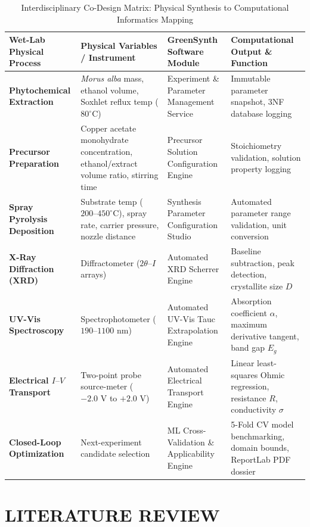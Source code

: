 \documentclass[12pt,a4paper,oneside]{report}
\begin{document}
{{{\begin{table}[h!]
\centering
\caption{Interdisciplinary Co-Design Matrix: Physical Synthesis to Computational Informatics Mapping}
\label{tab:interdisciplinary_matrix}
\begin{tabular}{|p{3.2cm}|p{3.8cm}|p{3.8cm}|p{4.2cm}|}
\hline
\textbf{Wet-Lab Physical Process} & \textbf{Physical Variables / Instrument} & \textbf{GreenSynth Software Module} & \textbf{Computational Output \& Function} \\
\hline
\textbf{Phytochemical Extraction} & \textit{Morus alba} mass, ethanol volume, Soxhlet reflux temp ($80^\circ\text{C}$) & Experiment \& Parameter Management Service & Immutable parameter snapshot, 3NF database logging \\
\hline
\textbf{Precursor Preparation} & Copper acetate monohydrate concentration, ethanol/extract volume ratio, stirring time & Precursor Solution Configuration Engine & Stoichiometry validation, solution property logging \\
\hline
\textbf{Spray Pyrolysis Deposition} & Substrate temp ($200\text{--}450^\circ\text{C}$), spray rate, carrier pressure, nozzle distance & Synthesis Parameter Configuration Studio & Automated parameter range validation, unit conversion \\
\hline
\textbf{X-Ray Diffraction (XRD)} & Diffractometer ($2\theta\text{--}I$ arrays) & Automated XRD Scherrer Engine & Baseline subtraction, peak detection, crystallite size $D$ \\
\hline
\textbf{UV-Vis Spectroscopy} & Spectrophotometer ($190\text{--}1100\text{ nm}$) & Automated UV-Vis Tauc Extrapolation Engine & Absorption coefficient $\alpha$, maximum derivative tangent, band gap $E_g$ \\
\hline
\textbf{Electrical $I\text{--}V$ Transport} & Two-point probe source-meter ($-2.0\text{ V}$ to $+2.0\text{ V}$) & Automated Electrical Transport Engine & Linear least-squares Ohmic regression, resistance $R$, conductivity $\sigma$ \\
\hline
\textbf{Closed-Loop Optimization} & Next-experiment candidate selection & ML Cross-Validation \& Applicability Engine & 5-Fold CV model benchmarking, domain bounds, ReportLab PDF dossier \\
\hline
\end{tabular}
\end{table}

\chapter{LITERATURE REVIEW}

}}}
\end{document}
